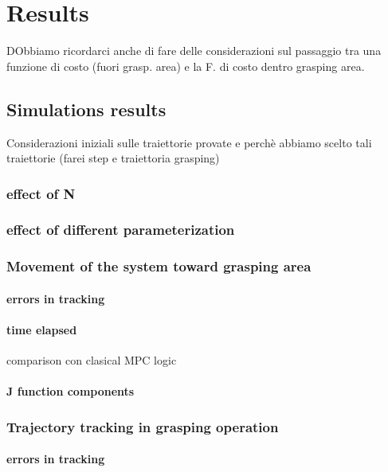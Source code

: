 
\chapter{Results}
\label{chapter7}

DObbiamo ricordarci anche di fare delle considerazioni sul passaggio tra una funzione di costo (fuori grasp. area) e la F. di costo dentro grasping area.

\section{Simulations results}
Considerazioni iniziali sulle traiettorie provate e perchè abbiamo scelto tali traiettorie (farei step e traiettoria grasping)
	\subsection{effect of N}
		
	\subsection{effect of different parameterization}
		
	\subsection{Movement of the system toward grasping area}

		\subsubsection{errors in tracking}
			
		\subsubsection{time elapsed}
			comparison con clasical MPC logic
		\subsubsection{J function components}

	\subsection{Trajectory tracking in grasping operation}

		\subsubsection{errors in tracking}
			
